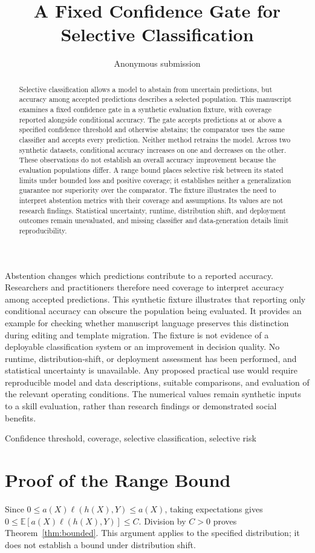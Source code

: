 \documentclass[journal]{IEEEtai}
\title{A Fixed Confidence Gate for Selective Classification}
\author{Anonymous submission}
\begin{document}
\maketitle
\begin{abstract}
Selective classification allows a model to abstain from uncertain predictions,
but accuracy among accepted predictions describes a selected population.
This manuscript examines a fixed confidence gate in a synthetic evaluation
fixture, with coverage reported alongside conditional accuracy. The gate
accepts predictions at or above a specified confidence threshold and otherwise
abstains; the comparator uses the same classifier and accepts every prediction.
Neither method retrains the model. Across two synthetic datasets, conditional
accuracy increases on one and decreases on the other. These observations do
not establish an overall accuracy improvement because the evaluation
populations differ. A range bound places selective risk between its stated
limits under bounded loss and positive coverage; it establishes neither a
generalization guarantee nor superiority over the comparator. The fixture
illustrates the need to interpret abstention metrics with their coverage and
assumptions. Its values are not research findings. Statistical uncertainty,
runtime, distribution shift, and deployment outcomes remain unevaluated,
and missing classifier and data-generation details limit reproducibility.
\end{abstract}
\begin{IEEEImpStatement}
Abstention changes which predictions contribute to a reported accuracy.
Researchers and practitioners therefore need coverage to interpret accuracy
among accepted predictions. This synthetic fixture illustrates that reporting
only conditional accuracy can obscure the population being evaluated. It
provides an example for checking whether manuscript language preserves this
distinction during editing and template migration. The fixture is not evidence
of a deployable classification system or an improvement in decision quality.
No runtime, distribution-shift, or deployment assessment has been performed,
and statistical uncertainty is unavailable. Any proposed practical use would
require reproducible model and data descriptions, suitable comparisons,
and evaluation of the relevant operating conditions. The numerical values
remain synthetic inputs to a skill evaluation, rather than research findings
or demonstrated social benefits.
\end{IEEEImpStatement}
\begin{IEEEkeywords}
Confidence threshold, coverage, selective classification, selective risk
\end{IEEEkeywords}


\appendices
\section{Proof of the Range Bound}\label{app:proof}
Since $0\leq a(X)\ell(h(X),Y)\leq a(X)$, taking expectations gives
$0\leq\mathbb{E}[a(X)\ell(h(X),Y)]\leq C$. Division by $C>0$ proves
Theorem~\ref{thm:bounded}. This argument applies to the specified distribution;
it does not establish a bound under distribution shift.
\end{document}
